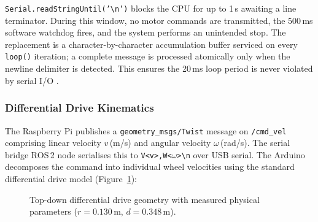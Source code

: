 \documentclass[12pt,a4paper]{report}
\begin{document}
\texttt{Serial.readStringUntil('\textbackslash n')} blocks the CPU for up to
1\,s awaiting a line terminator. During this window, no motor commands are
transmitted, the 500\,ms software watchdog fires, and the system performs an
unintended stop. The replacement is a character-by-character accumulation
buffer serviced on every \texttt{loop()} iteration; a complete message is
processed atomically only when the newline delimiter is detected. This ensures
the 20\,ms loop period is never violated by serial I/O
\cite{ganssle2008firmware}.

\subsubsection{Differential Drive Kinematics}
\label{subsec:diff_kinematics_impl}

The Raspberry Pi publishes a \texttt{geometry\_msgs/Twist} message on
\texttt{/cmd\_vel} comprising linear velocity $v$\,(m/s) and angular velocity
$\omega$\,(rad/s). The serial bridge ROS\,2 node serialises this to
\texttt{V<v>,W<\(\omega\)>\textbackslash n} over USB serial. The Arduino
decomposes the command into individual wheel velocities using the standard
differential drive model \cite{siegwart2011intro}
(Figure~\ref{fig:diff_drive_impl}):

\begin{figure}[H]
\centering
{}
\caption{Top-down differential drive geometry with measured physical
  parameters ($r = 0.130$\,m, $d = 0.348$\,m).}
\label{fig:diff_drive_impl}
\end{figure}
\end{document}
